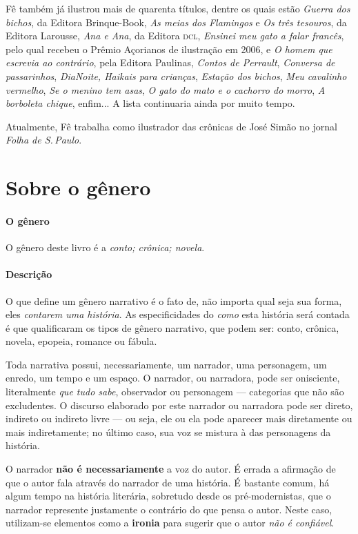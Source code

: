 \documentclass[11pt]{extarticle}
\begin{document}
Fê também já ilustrou mais de quarenta títulos, dentre os quais estão \textit{Guerra dos bichos}, da Editora Brinque-Book, \textit{As meias dos Flamingos} e \textit{Os três tesouros}, da Editora Larousse,
\textit{Ana e Ana}, da Editora \textsc{dcl}, \textit{Ensinei meu gato a falar francês}, pelo qual recebeu o Prêmio Açorianos de ilustração em 2006, e \textit{O homem que escrevia ao contrário}, pela Editora Paulinas, \textit{Contos de Perrault}, \textit{Conversa de passarinhos}, \textit{DiaNoite, Haikais para crianças}, \textit{Estação dos bichos},
\textit{Meu cavalinho vermelho}, \textit{Se o menino tem asas}, \textit{O gato do mato e o cachorro do morro},
\textit{A borboleta chique}, enfim... A lista continuaria ainda por muito tempo. 

Atualmente, Fê trabalha como ilustrador das crônicas de José Simão no jornal \textit{Folha de S.\,Paulo}.


\section{Sobre o gênero}

\paragraph{O gênero} O gênero deste livro é a \textit{conto; crônica; novela}. 

\paragraph{Descrição} O que define um gênero narrativo é o fato de, não importa
qual seja sua forma, eles \textit{contarem uma história}.
As especificidades do \textit{como} esta história será contada é que
qualificaram os tipos de gênero narrativo, que podem ser: conto, crônica, novela,
epopeia, romance ou fábula. 

Toda narrativa possui, necessariamente, um narrador, uma personagem, um enredo,
um tempo e um espaço. O narrador, ou narradora, pode ser onisciente, literalmente
\textit{que tudo sabe}, observador ou personagem --- categorias que não são excludentes.
O discurso elaborado por este narrador ou narradora pode ser direto, indireto ou indireto livre 
--- ou seja, ele ou ela pode aparecer mais diretamente ou mais indiretamente; no último caso,
sua voz se mistura à das personagens da história.

O narrador \textbf{não é necessariamente} a voz do autor. É errada a afirmação
de que o autor fala através do narrador de uma história. É bastante comum,
há algum tempo na história literária, sobretudo desde os pré-modernistas, que 
o narrador represente justamente o contrário do que pensa o autor. Neste caso, 
utilizam-se elementos como a \textbf{ironia} para sugerir que o autor \textit{não é confiável}.
\end{document}
